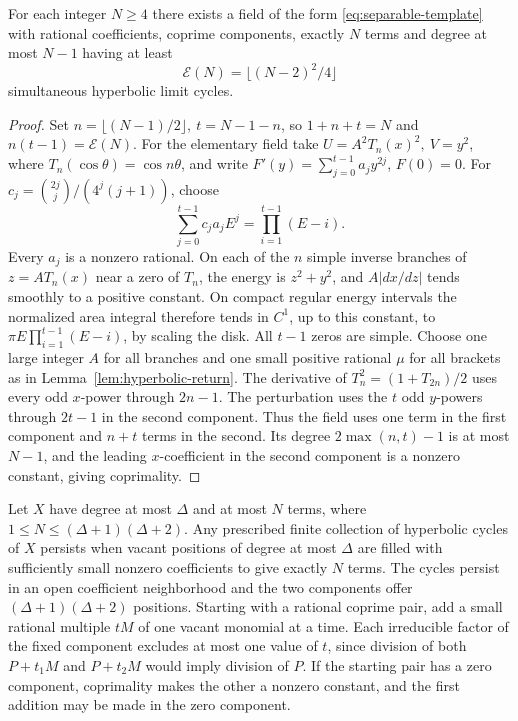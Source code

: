 \begin{proposition}\label{thm:allocation}
For each integer \(N\ge4\) there exists a field of the form \eqref{eq:separable-template} with rational coefficients, coprime components, exactly \(N\) terms and degree at most \(N-1\) having at least
\begin{equation}\label{eq:base}
 \mathcal E(N)=\lfloor(N-2)^2/4\rfloor
\end{equation}
simultaneous hyperbolic limit cycles.
\end{proposition}
\begin{proof}
Set \(n=\lfloor(N-1)/2\rfloor,\ t=N-1-n\), so \(1+n+t=N\) and \(n(t-1)=\mathcal E(N)\).
For the elementary field take \(U=A^2T_n(x)^2,\ V=y^2\), where \(T_n(\cos\theta)=\cos n\theta\), and write \(F'(y)=\sum_{j=0}^{t-1}a_j y^{2j}\), \(F(0)=0\).
For \(c_j=\binom{2j}{j}/(4^j(j+1))\), choose
\[
 \sum_{j=0}^{t-1}c_j a_j E^j=\prod_{i=1}^{t-1}(E-i).
\]
Every \(a_j\) is a nonzero rational. On each of the \(n\) simple inverse branches of \(z=AT_n(x)\) near a zero of \(T_n\), the energy is \(z^2+y^2\), and \(A|dx/dz|\) tends smoothly to a positive constant. On compact regular energy intervals the normalized area integral therefore tends in \(C^1\), up to this constant, to \(\pi E\prod_{i=1}^{t-1}(E-i)\), by scaling the disk. All \(t-1\) zeros are simple. Choose one large integer \(A\) for all branches and one small positive rational \(\mu\) for all brackets as in Lemma~\ref{lem:hyperbolic-return}. The derivative of \(T_n^2=(1+T_{2n})/2\) uses every odd \(x\)-power through \(2n-1\). The perturbation uses the \(t\) odd \(y\)-powers through \(2t-1\) in the second component. Thus the field uses one term in the first component and \(n+t\) terms in the second. Its degree \(2\max(n,t)-1\) is at most \(N-1\), and the leading \(x\)-coefficient in the second component is a nonzero constant, giving coprimality.
\end{proof}

\begin{remark}\label{rem:exact-fill}
Let \(X\) have degree at most \(\Delta\) and at most \(N\) terms, where \(1\le N\le(\Delta+1)(\Delta+2)\). Any prescribed finite collection of hyperbolic cycles of \(X\) persists when vacant positions of degree at most \(\Delta\) are filled with sufficiently small nonzero coefficients to give exactly \(N\) terms. The cycles persist in an open coefficient neighborhood and the two components offer \((\Delta+1)(\Delta+2)\) positions. Starting with a rational coprime pair, add a small rational multiple \(tM\) of one vacant monomial at a time. Each irreducible factor of the fixed component excludes at most one value of \(t\), since division of both \(P+t_1M\) and \(P+t_2M\) would imply division of \(P\). If the starting pair has a zero component, coprimality makes the other a nonzero constant, and the first addition may be made in the zero component.
\end{remark}
